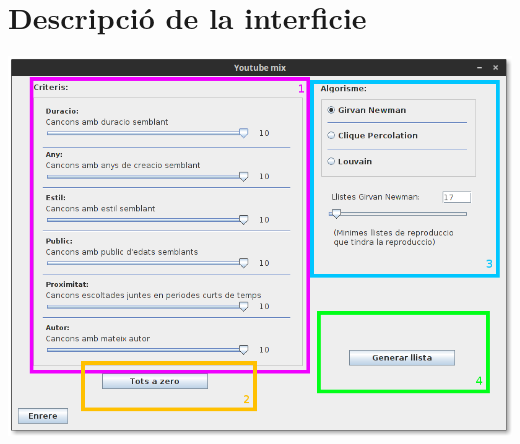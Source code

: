 \documentclass[a4paper,10pt,oneside]{sphinxmanual}
\begin{document}
\section{Descripció de la interficie}
\label{gen_llistes:descripcio-de-la-interficie}
\includegraphics{gen_llist.png}
\end{document}
